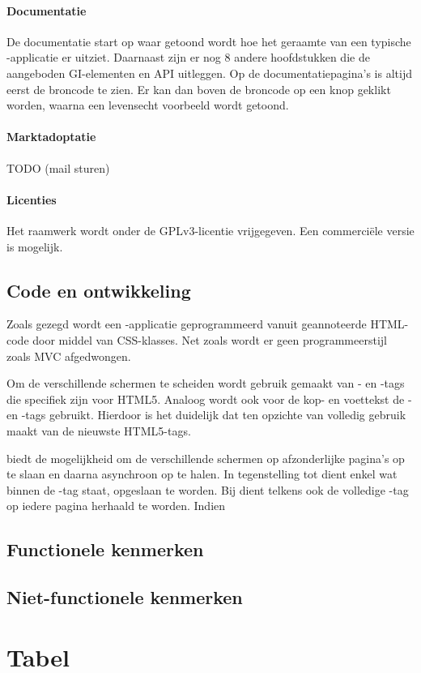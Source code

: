 \paragraph{Documentatie}
De documentatie start op  waar getoond wordt hoe het geraamte van een typische \lungo{}-applicatie er uitziet.
Daarnaast zijn er nog 8 andere hoofdstukken die de aangeboden GI-elementen en API uitleggen.
Op de documentatiepagina's is altijd eerst de broncode te zien.
Er kan dan boven de broncode op een knop geklikt worden, waarna een levensecht voorbeeld wordt getoond.

\paragraph{Marktadoptatie}
TODO (mail sturen)

\paragraph{Licenties}
Het raamwerk wordt onder de GPLv3-licentie vrijgegeven.
Een commerciële versie is mogelijk.

\subsection{Code en ontwikkeling}
Zoals gezegd wordt een \lungo{}-applicatie geprogrammeerd vanuit geannoteerde HTML-code door middel van CSS-klasses.
Net zoals \jqm{} wordt er geen programmeerstijl zoals MVC afgedwongen.

Om de verschillende schermen te scheiden wordt gebruik gemaakt van - en -tags die specifiek zijn voor HTML5.
Analoog wordt ook voor de kop- en voettekst de - en -tags gebruikt.
Hierdoor is het duidelijk dat \lungo{} ten opzichte van \jqm{} volledig gebruik maakt van de nieuwste HTML5-tags.

\lungo{} biedt de mogelijkheid om de verschillende schermen op afzonderlijke pagina's op te slaan en daarna asynchroon op te halen.
In tegenstelling tot \jqm{} dient enkel wat binnen de -tag staat, opgeslaan te worden.
Bij \jqm{} dient telkens ook de volledige -tag op iedere pagina herhaald te worden.
Indien 

\subsection{Functionele kenmerken}
\subsection{Niet-functionele kenmerken}

\section{Tabel}
\label{sec:raamwerken-tabel}
